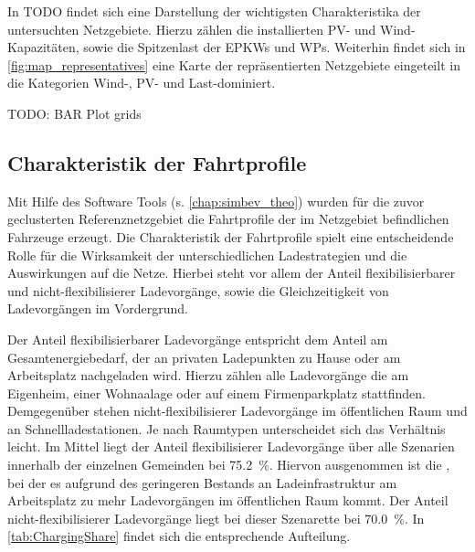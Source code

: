 In {\color{red} TODO} findet sich eine Darstellung der wichtigsten Charakteristika der untersuchten Netzgebiete.
Hierzu zählen die installierten \gls{PV}- und Wind-Kapazitäten, sowie die Spitzenlast der \glspl{EPKW} und \glspl{WP}.
Weiterhin findet sich in \autoref{fig:map_representatives} eine Karte der repräsentierten Netzgebiete eingeteilt in die Kategorien Wind-, \gls{PV}- und Last-dominiert.

{\color{red} TODO: BAR Plot grids}





\subsection{Charakteristik der Fahrtprofile}



Mit Hilfe des Software Tools \simbev (s. \autoref{chap:simbev_theo}) wurden für die zuvor geclusterten Referenznetzgebiet die Fahrtprofile der im Netzgebiet befindlichen Fahrzeuge erzeugt.
Die Charakteristik der Fahrtprofile spielt eine entscheidende Rolle für die Wirksamkeit der unterschiedlichen Ladestrategien und die Auswirkungen auf die Netze.
Hierbei steht vor allem der Anteil flexibilisierbarer und nicht-flexibilisierer Ladevorgänge, sowie die Gleichzeitigkeit von Ladevorgängen im Vordergrund.\medskip

Der Anteil flexibilisierbarer Ladevorgänge entspricht dem Anteil am Gesamtenergiebedarf, der an privaten Ladepunkten zu Hause oder am Arbeitsplatz nachgeladen wird.
Hierzu zählen alle Ladevorgänge die am Eigenheim, einer Wohnaalage oder auf einem Firmenparkplatz stattfinden.
Demgegenüber stehen nicht-flexibilisierer Ladevorgänge im öffentlichen Raum und an Schnellladestationen.
Je nach Raumtypen unterscheidet sich das Verhältnis leicht.
Im Mittel liegt der Anteil flexibilisierer Ladevorgänge über alle Szenarien innerhalb der einzelnen Gemeinden bei \SI{75.2}{\percent}.
Hiervon ausgenommen ist die \SzeFirmenparkplatzdot, bei der es aufgrund des geringeren Bestands an Ladeinfrastruktur am Arbeitsplatz zu mehr Ladevorgängen im öffentlichen Raum kommt.
Der Anteil nicht-flexibilisierer Ladevorgänge liegt bei dieser Szenarette bei \SI{70.0}{\percent}.
In \autoref{tab:ChargingShare} findet sich die entsprechende Aufteilung.

